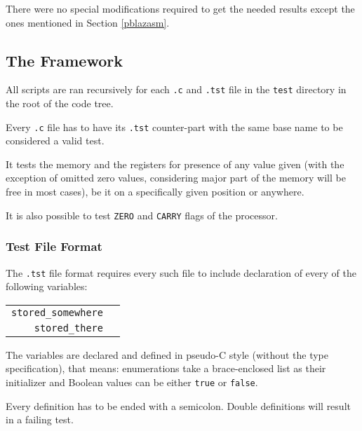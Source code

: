                 There were no special modifications required to get the needed results except the ones mentioned in Section \ref{pblazasm}.

        \subsection{The Framework}

        All scripts are ran recursively for each \texttt{.c} and \texttt{.tst} file in the \texttt{test} directory in the root of the code tree.

        Every \texttt{.c} file has to have its \texttt{.tst} counter-part with the same base name to be considered a valid test.

        It tests the memory and the registers for presence of any value given (with the exception of omitted zero values, considering major part of the memory will be free in most cases), be it on a specifically given position or anywhere.

        It is also possible to test \texttt{ZERO} and \texttt{CARRY} flags of the processor.

            \subsubsection{Test File Format}

            The \texttt{.tst} file format requires every such file to include declaration of every of the following variables:

            \begin{center}
            \begin{tabular}{ r | l }
                \texttt{stored\_somewhere} & \todo{...}\\

                \texttt{stored\_there} & \todo{...}\\

            \end{tabular}
            \end{center}

            The variables are declared and defined in pseudo-C style (without the type specification), that means: enumerations take a brace-enclosed list as their initializer and Boolean values can be either \texttt{true} or \texttt{false}.

            Every definition has to be ended with a semicolon. Double definitions will result in a failing test.

